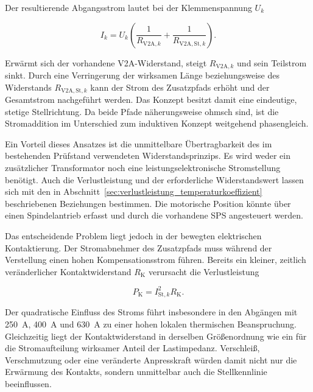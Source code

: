 Der resultierende Abgangsstrom lautet bei der Klemmenspannung
$U_k$

\begin{equation}
    I_k
    =
    U_k
    \left(
        \frac{1}{R_{\mathrm{V2A},k}}
        +
        \frac{1}{R_{\mathrm{V2A,St},k}}
    \right).
    \label{eq:paralleler_v2a_strom}
\end{equation}

Erwärmt sich der vorhandene V2A-Widerstand, steigt
$R_{\mathrm{V2A},k}$ und sein Teilstrom sinkt. Durch eine Verringerung der
wirksamen Länge beziehungsweise des Widerstands
$R_{\mathrm{V2A,St},k}$ kann der Strom des Zusatzpfads erhöht und der
Gesamtstrom nachgeführt werden. Das Konzept besitzt damit eine eindeutige,
stetige Stellrichtung. Da beide Pfade näherungsweise ohmsch sind, ist die
Stromaddition im Unterschied zum induktiven Konzept weitgehend phasengleich.

Ein Vorteil dieses Ansatzes ist die unmittelbare Übertragbarkeit des im
bestehenden Prüfstand verwendeten Widerstandsprinzips. Es wird weder ein
zusätzlicher Transformator noch eine leistungselektronische Stromstellung
benötigt. Auch die Verlustleistung und der erforderliche Widerstandswert
lassen sich mit den in Abschnitt~\ref{sec:verlustleistung_temperaturkoeffizient}
beschriebenen Beziehungen bestimmen. Die motorische Position könnte über
einen Spindelantrieb erfasst und durch die vorhandene SPS angesteuert werden.

Das entscheidende Problem liegt jedoch in der bewegten elektrischen
Kontaktierung. Der Stromabnehmer des Zusatzpfads muss während der Verstellung
einen hohen Kompensationsstrom führen. Bereits ein kleiner, zeitlich
veränderlicher Kontaktwiderstand $R_{\mathrm K}$ verursacht die
Verlustleistung

\begin{equation}
    P_{\mathrm K}
    =
    I_{\mathrm{St},k}^{2}R_{\mathrm K}.
    \label{eq:konzept_v2a_kontaktverlust}
\end{equation}

Der quadratische Einfluss des Stroms führt insbesondere in den Abgängen mit
\SI{250}{\ampere}, \SI{400}{\ampere} und \SI{630}{\ampere} zu einer hohen
lokalen thermischen Beanspruchung. Gleichzeitig liegt der Kontaktwiderstand
in derselben Größenordnung wie ein für die Stromaufteilung wirksamer Anteil
der Lastimpedanz. Verschleiß, Verschmutzung oder eine veränderte Anpresskraft
würden damit nicht nur die Erwärmung des Kontakts, sondern unmittelbar auch
die Stellkennlinie beeinflussen.

